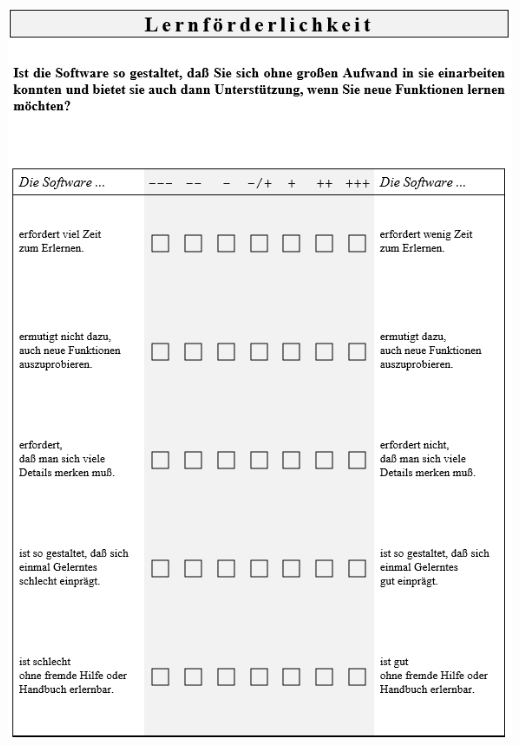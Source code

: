 \bigskip\noindent
\begin{minipage}{\textwidth}
  \centering
  \includegraphics{img/ISO9241-10Fragebogen_S7.PNG}
\end{minipage}

